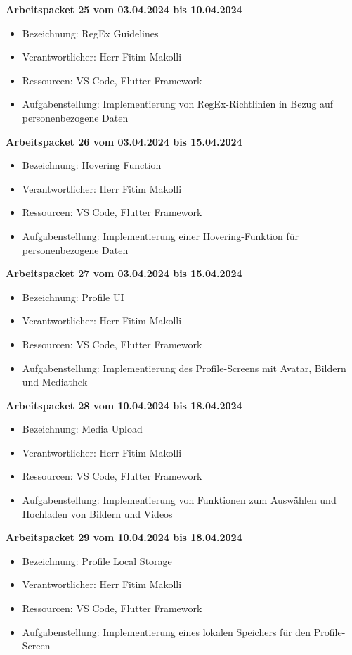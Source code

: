 \textbf{Arbeitspacket 25 vom 03.04.2024 bis 10.04.2024}
\begin{itemize}[itemsep=0pt]
    \item{Bezeichnung: RegEx Guidelines} 
	\item{Verantwortlicher: Herr Fitim Makolli} 
	\item{Ressourcen: VS Code, Flutter Framework}
    \item{Aufgabenstellung: Implementierung von RegEx-Richtlinien in Bezug auf personenbezogene Daten}
\end{itemize} 

\textbf{Arbeitspacket 26 vom 03.04.2024 bis 15.04.2024}
\begin{itemize}[itemsep=0pt]
    \item{Bezeichnung: Hovering Function} 
	\item{Verantwortlicher: Herr Fitim Makolli} 
	\item{Ressourcen: VS Code, Flutter Framework}
    \item{Aufgabenstellung: Implementierung einer Hovering-Funktion für personenbezogene Daten} 
\end{itemize}

\textbf{Arbeitspacket 27 vom 03.04.2024 bis 15.04.2024}
\begin{itemize}[itemsep=0pt]
    \item{Bezeichnung: Profile UI} 
	\item{Verantwortlicher: Herr Fitim Makolli} 
	\item{Ressourcen: VS Code, Flutter Framework} 
    \item{Aufgabenstellung: Implementierung des Profile-Screens mit Avatar, Bildern und Mediathek}
\end{itemize}

\newpage
\textbf{Arbeitspacket 28 vom 10.04.2024 bis 18.04.2024}
\begin{itemize}[itemsep=0pt]
    \item{Bezeichnung: Media Upload} 
	\item{Verantwortlicher: Herr Fitim Makolli} 
	\item{Ressourcen: VS Code, Flutter Framework} 
    \item{Aufgabenstellung: Implementierung von Funktionen zum Auswählen und Hochladen von Bildern und Videos}
\end{itemize} 

\textbf{Arbeitspacket 29 vom 10.04.2024 bis 18.04.2024}
\begin{itemize}[itemsep=0pt]
    \item{Bezeichnung: Profile Local Storage} 
	\item{Verantwortlicher: Herr Fitim Makolli} 
	\item{Ressourcen: VS Code, Flutter Framework} 
    \item{Aufgabenstellung: Implementierung eines lokalen Speichers für den Profile-Screen}
\end{itemize}

